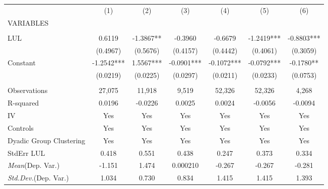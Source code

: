 \documentclass[]{article}
\begin{document}
\begin{tabular}{lcccccc} \hline
 & (1) & (2) & (3) & (4) & (5) & (6) \\
VARIABLES &  &  &  &  &  &  \\ \hline
 &  &  &  &  &  &  \\
LUL & 0.6119 & -1.3867** & -0.3960 & -0.6679 & -1.2419*** & -0.8803*** \\
 & (0.4967) & (0.5676) & (0.4157) & (0.4442) & (0.4061) & (0.3059) \\
Constant & -1.2542*** & 1.5567*** & -0.0901*** & -0.1072*** & -0.0792*** & -0.1780** \\
 & (0.0219) & (0.0225) & (0.0297) & (0.0211) & (0.0233) & (0.0753) \\
 &  &  &  &  &  &  \\
Observations & 27,075 & 11,918 & 9,519 & 52,326 & 52,326 & 4,268 \\
R-squared & 0.0196 & -0.0226 & 0.0025 & 0.0024 & -0.0056 & -0.0094 \\
IV & Yes & Yes & Yes & Yes & Yes & Yes \\
Controls & Yes & Yes & Yes & Yes & Yes & Yes \\
Dyadic Group Clustering & Yes & Yes & Yes & Yes & Yes & Yes \\
StdErr LUL & 0.418 & 0.551 & 0.438 & 0.247 & 0.373 & 0.334 \\
\textit{Mean}(Dep. Var.) & -1.151 & 1.474 & 0.000210 & -0.267 & -0.267 & -0.281 \\
 \textit{Std.Dev.}(Dep. Var.) & 1.034 & 0.730 & 0.834 & 1.415 & 1.415 & 1.393 \\ \hline
\end{tabular}
\end{document}
